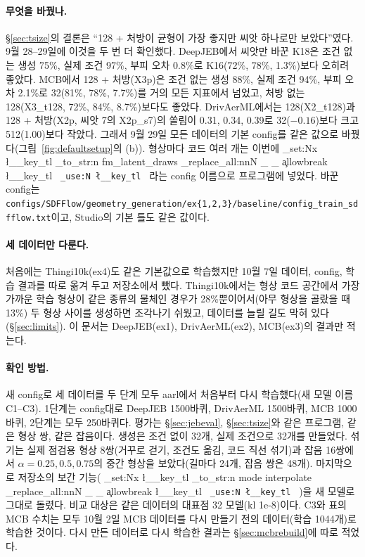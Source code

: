 \documentclass[11pt]{article}
\DeclareRobustCommand{\key}[1]{
  \tl_set:Nx \l__key_tl { \tl_to_str:n {#1} }
  \regex_replace_all:nnN { \_ } { \cO\_ \c{allowbreak} } \l__key_tl
  \texttt{ \tl_use:N \l__key_tl }
}
\begin{document}
\paragraph{무엇을 바꿨나.} \S\ref{sec:tsize}의 결론은 ``128 + 처방이 균형이 가장 좋지만 씨앗 하나로만 보았다''였다.
9월 28--29일에 이것을 두 번 더 확인했다. DeepJEB에서 씨앗만 바꾼 K18은 조건 없는 생성 75\%, 실제 조건 97\%, 부피 오차 0.8\%로 K16(72\%, 78\%, 1.3\%)보다
오히려 좋았다. MCB에서 128 + 처방(X3p)은 조건 없는 생성 88\%, 실제 조건 94\%, 부피 오차 2.1\%로 32(81\%, 78\%, 7.7\%)를 거의 모든 지표에서 넘었고,
처방 없는 128(X3\_t128, 72\%, 84\%, 8.7\%)보다도 좋았다. DrivAerML에서는 128(X2\_t128)과 128 + 처방(X2p, 씨앗 7의 X2p\_s7)의 쏠림이 0.31, 0.34, 0.39로
32($-0.16$)보다 크고 512(1.00)보다 작았다. 그래서 9월 29일 모든 데이터의 기본 config를 같은 값으로 바꿨다(그림~\ref{fig:defaultsetup}의 (b)).
형상마다 코드 여러 개는 이번에 \key{fm_latent_draws}라는 config 이름으로 프로그램에 넣었다.
바꾼 config는 \texttt{configs/SDFFlow/geometry\_generation/ex\{1,2,3\}/baseline/config\_train\_sdfflow.txt}이고, Studio의 기본 틀도 같은 값이다.

\paragraph{세 데이터만 다룬다.} 처음에는 Thingi10k(ex4)도 같은 기본값으로 학습했지만 10월 7일 데이터, config, 학습 결과를 따로 옮겨 두고 저장소에서 뺐다.
Thingi10k에서는 형상 코드 공간에서 가장 가까운 학습 형상이 같은 종류의 물체인 경우가 28\%뿐이어서(아무 형상을 골랐을 때 13\%) 두 형상 사이를 생성하면 조각나기 쉬웠고, 데이터를 늘릴 길도 막혀 있다(\S\ref{sec:limits}).
이 문서는 DeepJEB(ex1), DrivAerML(ex2), MCB(ex3)의 결과만 적는다.

\paragraph{확인 방법.} 새 config로 세 데이터를 두 단계 모두 aarl에서 처음부터 다시 학습했다(새 모델 이름 C1--C3).
1단계는 config대로 DeepJEB 1500바퀴, DrivAerML 1500바퀴, MCB 1000바퀴, 2단계는 모두 250바퀴다.
평가는 \S\ref{sec:jebeval}, \S\ref{sec:tsize}와 같은 프로그램, 같은 형상 쌍, 같은 잡음이다. 생성은 조건 없이 32개, 실제 조건으로 32개를 만들었다.
섞기는 실제 점검용 형상 8쌍(거꾸로 걷기, 조건도 옮김, 코드 직선 섞기)과 잡음 16쌍에서 $\alpha=0.25, 0.5, 0.75$의 중간 형상을 보았다(길마다 24개, 잡음 쌍은 48개).
마지막으로 저장소의 보간 기능(\key{mode interpolate})을 새 모델로 그대로 돌렸다.
비교 대상은 같은 데이터의 대표점 32 모델(kl 1e-8)이다.
C3와 표의 MCB 수치는 모두 10월 2일 MCB 데이터를 다시 만들기 전의 데이터(학습 1044개)로 학습한 것이다. 다시 만든 데이터로 다시 학습한 결과는 \S\ref{sec:mcbrebuild}에 따로 적었다.
\end{document}
